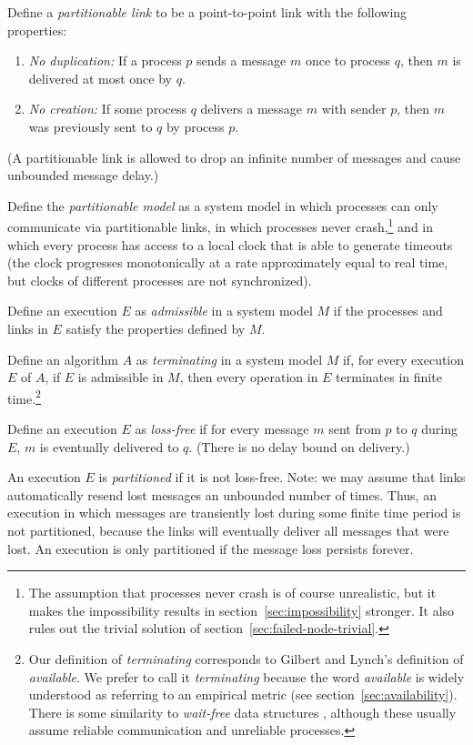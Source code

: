\documentclass[fleqn,12pt,lineno]{wlpeerj} %
\begin{document}
Define a \emph{partitionable link} to be a point-to-point link with the following properties:
\begin{enumerate}
    \item \emph{No duplication:} If a process $p$ sends a message $m$ once to process $q$, then $m$
        is delivered at most once by $q$.
    \item \emph{No creation:} If some process $q$ delivers a message $m$ with sender $p$, then $m$
        was previously sent to $q$ by process $p$.
\end{enumerate}
(A partitionable link is allowed to drop an infinite number of messages and cause unbounded message
delay.)

Define the \emph{partitionable model} as a system model in which processes can only communicate via
partitionable links, in which processes never crash,\footnote{The assumption that processes never
crash is of course unrealistic, but it makes the impossibility results in
section~\ref{sec:impossibility} stronger. It also rules out the trivial solution of
section~\ref{sec:failed-node-trivial}.} and in which every process has access to a local clock that
is able to generate timeouts (the clock progresses monotonically at a rate approximately equal to
real time, but clocks of different processes are not synchronized).

Define an execution $E$ as \emph{admissible} in a system model $M$ if the processes and links in $E$
satisfy the properties defined by $M$.

Define an algorithm $A$ as \emph{terminating} in a system model $M$ if, for every execution $E$ of
$A$, if $E$ is admissible in $M$, then every operation in $E$ terminates in finite
time.\footnote{Our definition of \emph{terminating} corresponds to Gilbert and Lynch's definition of
\emph{available}. We prefer to call it \emph{terminating} because the word \emph{available} is
widely understood as referring to an empirical metric (see section~\ref{sec:availability}). There is
some similarity to \emph{wait-free} data structures \citep{Herlihy1988br}, although these usually
assume reliable communication and unreliable processes.}

Define an execution $E$ as \emph{loss-free} if for every message $m$ sent from $p$ to $q$ during
$E$, $m$ is eventually delivered to $q$. (There is no delay bound on delivery.)

An execution $E$ is \emph{partitioned} if it is not loss-free. Note: we may assume that links
automatically resend lost messages an unbounded number of times. Thus, an execution in which
messages are transiently lost during some finite time period is not partitioned, because the links
will eventually deliver all messages that were lost. An execution is only partitioned if the message
loss persists forever.
\end{document}
